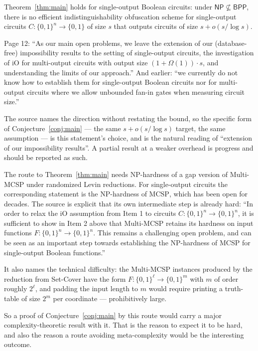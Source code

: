 \documentclass{aicr-conjecture}
\newcommand{\Om}{\Omega}
\newcommand{\bits}{\{0,1\}}
\newcommand{\NP}{\mathsf{NP}}
\newcommand{\BPP}{\mathsf{BPP}}
\newcommand{\MCSP}{\mathrm{MCSP}}
\begin{document}
\begin{conjecture}\label{conj:main}
Theorem~\ref{thm:main} holds for single-output Boolean circuits: under
$\NP \not\subseteq \BPP$, there is no efficient indistinguishability
obfuscation scheme for single-output circuits $C : \bits^{n} \to \bits$
of size $s$ that outputs circuits of size $s + o(s/\log s)$.
\end{conjecture}

\begin{remark}\label{rem:framing}
Page 12: ``As our main open problems, we leave the extension of our
(database-free) impossibility results to the setting of single-output
circuits, the investigation of iO for multi-output circuits with output
size $(1 + \Om(1)) \cdot s$, and understanding the limits of our
approach.'' And earlier: ``we currently do not know how to establish them
for single-output Boolean circuits nor for multi-output circuits where we
allow unbounded fan-in gates when measuring circuit size.''

The source names the direction without restating the bound, so the
specific form of Conjecture~\ref{conj:main} --- the same $s + o(s/\log s)$
target, the same assumption --- is this statement's choice, and is the
natural reading of ``extension of our impossibility results''. A partial
result at a weaker overhead is progress and should be reported as such.
\end{remark}

\begin{remark}\label{rem:obstruction}
The route to Theorem~\ref{thm:main} needs NP-hardness of a gap version of
Multi-MCSP under randomized Levin reductions. For single-output circuits
the corresponding statement is the NP-hardness of $\MCSP$, which has been
open for decades. The source is explicit that its own intermediate step
is already hard: ``In order to relax the iO assumption from Item 1 to
circuits $C : \bits^{n} \to \bits^{n}$, it is sufficient to show in Item
2 above that Multi-MCSP retains its hardness on input functions $F :
\bits^{n} \to \bits^{n}$. This remains a challenging open problem, and
can be seen as an important step towards establishing the NP-hardness of
MCSP for single-output Boolean functions.''

It also names the technical difficulty: the Multi-MCSP instances produced
by the reduction from Set-Cover have the form $F : \bits^{\ell} \to
\bits^{m}$ with $m$ of order roughly $2^{\ell}$, and padding the input
length to $m$ would require printing a truth-table of size $2^{m}$ per
coordinate --- prohibitively large.

So a proof of Conjecture~\ref{conj:main} by this route would carry a
major complexity-theoretic result with it. That is the reason to expect
it to be hard, and also the reason a route avoiding meta-complexity would
be the interesting outcome.
\end{remark}
\end{document}
